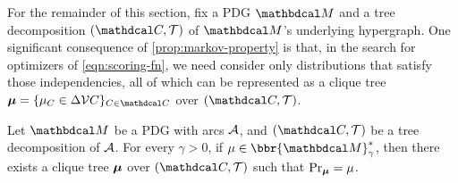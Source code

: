 \documentclass{article}
\begin{document}
For the remainder of this section, fix a PDG $\dg M$ and a tree decomposition $(\C, \mathcal T)$ of $\dg M$'s underlying hypergraph.
One significant consequence of \cref{prop:markov-property} is that, in the
search for optimizers of \eqref{eqn:scoring-fn}, we
need consider only distributions that satisfy those independencies,
all of which can be represented as a clique tree
$\bmu = \{\mu_C \in \Delta\V C \}_{C \in \C}$
over $(\C, \mathcal T)$.

\begin{coro}
    Let $\dg M$ be a PDG with arcs $\mathcal A$, and
    $(\C, \mathcal T)$ be a tree decomposition of $\mathcal A$.
    For every $\gamma > 0$, if
    $\mu \in \bbr{\dg M}^*_\gamma$, then there exists a clique tree
    $\boldsymbol\mu$ over $(\C, \mathcal T)$ such that $\Pr_{\boldsymbol\mu} = \mu$.
\end{coro}
\end{document}
